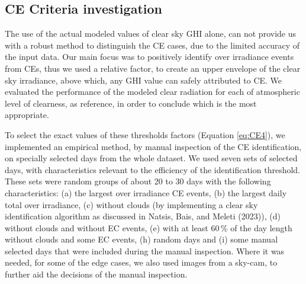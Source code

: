 \documentclass[
]{article}
\begin{document}
\hypertarget{ce-criteria-investigation}{%
\subsection{CE Criteria investigation}\label{ce-criteria-investigation}}

The use of the actual modeled values of clear sky GHI alone, can not provide us with
a robust method to distinguish the CE cases, due to the limited accuracy of the input
data. Our main focus was to positively identify over irradiance events from CEs, thus
we used a relative factor, to create an upper envelope of the clear sky irradiance,
above which, any GHI value can safely attributed to CE. We evaluated the performance
of the modeled clear radiation for each of atmospheric level of clearness, as
reference, in order to conclude which is the most appropriate.

To select the exact values of these thresholds factors (Equation \ref{eq:CE4}), we
implemented an empirical method, by manual inspection of the CE identification, on
specially selected days from the whole dataset. We used seven sets of selected days,
with characteristics relevant to the efficiency of the identification threshold.
These sets were random groups of about 20 to 30 days with the following
characteristics:
(a) the largest over irradiance CE events,
(b) the largest daily total over irradiance,
(c) without clouds (by implementing a clear sky identification algorithm as discussed in Natsis, Bais, and Meleti (2023)),
(d) without clouds and without EC events,
(e) with at least \(60\,\%\) of the day length without clouds and some EC events,
(h) random days and
(i) some manual selected days that were included during the manual inspection.
Where it was needed, for some of the edge cases, we also used images from a sky-cam,
to further aid the decisions of the manual inspection.
\end{document}
